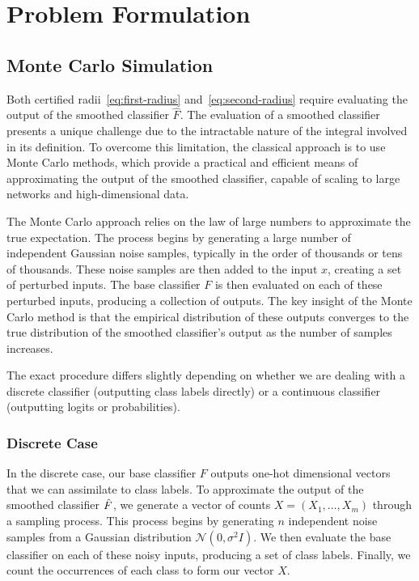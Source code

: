 \section{Problem Formulation}\label{sec:problem-formulation}

\subsection{Monte Carlo Simulation}\label{subsec:monte-carlo-simulation}

Both certified radii~\eqref{eq:first-radius} and~\eqref{eq:second-radius} require evaluating the output of the smoothed classifier $\hat{F}$.
The evaluation of a smoothed classifier presents a unique challenge due to the intractable nature of the integral involved in its definition.
To overcome this limitation, the classical approach is to use Monte Carlo methods, which provide a practical and efficient means of approximating the output of the smoothed classifier, capable of scaling to large networks and high-dimensional data.

The Monte Carlo approach relies on the law of large numbers to approximate the true expectation.
The process begins by generating a large number of independent Gaussian noise samples, typically in the order of thousands or tens of thousands.
These noise samples are then added to the input $x$, creating a set of perturbed inputs.
The base classifier $F$ is then evaluated on each of these perturbed inputs, producing a collection of outputs.
The key insight of the Monte Carlo method is that the empirical distribution of these outputs converges to the true distribution of the smoothed classifier's output as the number of samples increases.

The exact procedure differs slightly depending on whether we are dealing with a discrete classifier (outputting class labels directly) or a continuous classifier (outputting logits or probabilities).

\subsubsection{Discrete Case}\label{subsubsec:discrete-case-monte-carlo-simulation}
In the discrete case, our base classifier $F$ outputs one-hot dimensional vectors that we can assimilate to class labels.
To approximate the output of the smoothed classifier $\Hat{F}$, we generate a vector of counts $X = (X_1, \ldots, X_m)$ through a sampling process.
This process begins by generating $n$ independent noise samples from a Gaussian distribution $\mathcal{N}(0, \sigma^2 I)$.
We then evaluate the base classifier on each of these noisy inputs, producing a set of class labels.
Finally, we count the occurrences of each class to form our vector $X$.

